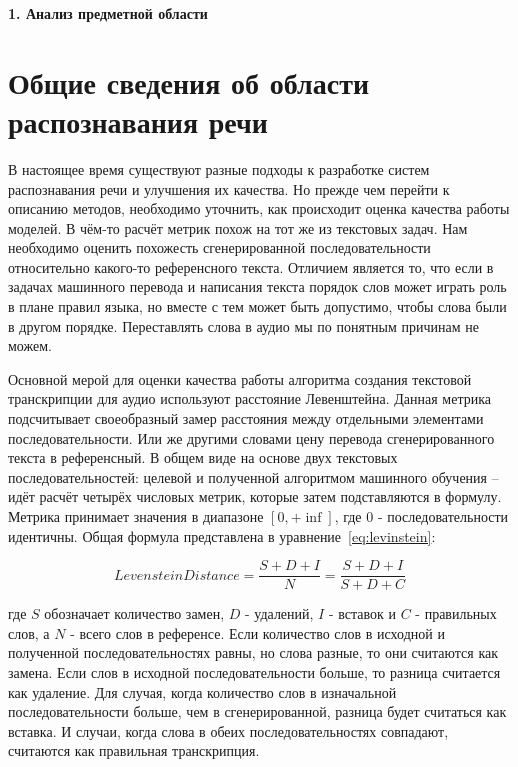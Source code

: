 \newpage
\begin{center}
  \textbf{\large 1. Анализ предметной области}
\end{center}


\section{Общие сведения об области распознавания речи}

В настоящее время существуют разные подходы к разработке систем распознавания речи и улучшения их качества\cite{toshniwal2018comparison, lei2023acoustic, tang2023salmonn}.
Но прежде чем перейти к описанию методов, необходимо уточнить, как происходит оценка качества работы моделей.
В чём-то расчёт метрик похож на тот же из текстовых задач.
Нам необходимо оценить похожесть сгенерированной последовательности относительно какого-то референсного текста.
Отличием является то, что если в задачах машинного перевода и написания текста порядок слов может играть роль в плане правил языка, но вместе с тем может быть допустимо, чтобы слова были в другом порядке.
Переставлять слова в аудио мы по понятным причинам не можем.

Основной мерой для оценки качества работы алгоритма создания текстовой транскрипции для аудио используют расстояние Левенштейна\cite{levenshtein1966binary, niessen2000evaluation}.
Данная метрика подсчитывает своеобразный замер расстояния между отдельными элементами последовательности.
Или же другими словами цену перевода сгенерированного текста в референсный.
В общем виде на основе двух текстовых последовательностей: целевой и полученной алгоритмом машинного обучения -- идёт расчёт четырёх числовых метрик, которые затем подставляются в формулу.
Метрика принимает значения в диапазоне $[0, +\inf]$, где 0 - последовательности идентичны.
Общая формула представлена в уравнение~\ref{eq:levinstein}:

\begin{equation}
  Levenstein Distance = \frac{S + D + I}{N} = \frac{S + D + I}{S + D + C}
  \label{eq:levinstein}
\end{equation}


где $S$ обозначает количество замен, $D$ - удалений, $I$ - вставок и $C$ - правильных слов, а $N$ - всего слов в референсе. 
Если количество слов в исходной и полученной последовательностях равны, но слова разные, то они считаются как замена. 
Если слов в исходной последовательности больше, то разница считается как удаление.
Для случая, когда количество слов в изначальной последовательности больше, чем в сгенерированной, разница будет считаться как вставка.
И случаи, когда слова в обеих последовательностях совпадают, считаются как правильная транскрипция.

